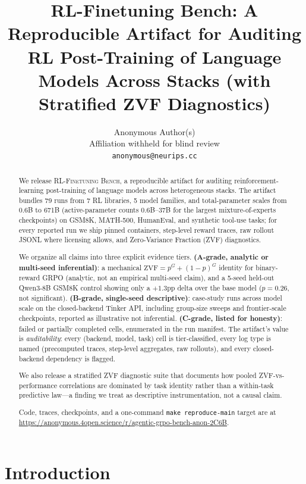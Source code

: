\documentclass{article}
\title{RL-Finetuning Bench: A Reproducible Artifact for Auditing RL Post-Training of Language Models Across Stacks (with Stratified ZVF Diagnostics)}
\author{Anonymous Author(s)\\
  Affiliation withheld for blind review\\
  \texttt{anonymous@neurips.cc}}
\newcommand{\ours}{\textsc{RL-Finetuning Bench}}
\begin{document}
\sloppy
{}
\hfuzz=2pt

\maketitle

\begin{abstract}
We release \ours{}, a reproducible artifact for auditing reinforcement-learning
post-training of language models across heterogeneous stacks. The artifact
bundles 79 runs from 7 RL libraries, 5 model families, and total-parameter
scales from 0.6B to 671B (active-parameter counts 0.6B--37B for the largest
mixture-of-experts checkpoints) on GSM8K, MATH-500, HumanEval, and synthetic
tool-use tasks; for every reported run we ship pinned containers, step-level
reward traces, raw rollout JSONL where licensing allows, and Zero-Variance
Fraction (ZVF) diagnostics.

We organize all claims into three explicit evidence tiers.
\textbf{(A-grade, analytic or multi-seed inferential)}: a mechanical
$\mathrm{ZVF}=p^{G}+(1{-}p)^{G}$ identity for binary-reward GRPO (analytic,
not an empirical multi-seed claim), and a 5-seed
held-out Qwen3-8B GSM8K control showing only a $+1.3$pp delta over the base
model ($p{=}0.26$, not significant). \textbf{(B-grade, single-seed descriptive)}:
case-study runs across model scale on the closed-backend Tinker API, including
group-size sweeps and frontier-scale checkpoints, reported as illustrative not
inferential. \textbf{(C-grade, listed for honesty)}: failed or partially
completed cells, enumerated in the run manifest. The artifact's value is
\emph{auditability}: every (backend, model, task) cell is tier-classified, every
log type is named (precomputed traces, step-level aggregates, raw rollouts), and
every closed-backend dependency is flagged.

We also release a stratified ZVF diagnostic suite that documents how pooled
ZVF-vs-performance correlations are dominated by task identity rather than a
within-task predictive law---a finding we treat as descriptive
instrumentation, not a causal claim.

Code, traces, checkpoints, and a one-command \texttt{make reproduce-main}
target are at
\url{https://anonymous.4open.science/r/agentic-grpo-bench-anon-2C6B}.
\end{abstract}
 \section{Introduction}
\label{sec:intro}
\end{document}
